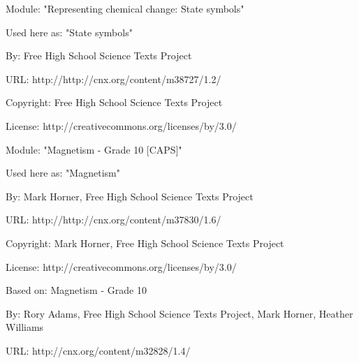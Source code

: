       \par\vspace{9pt}\noindent\begin{minipage}{\textwidth}
      Module: "Representing chemical change: State symbols" \par\nopagebreak\noindent
      Used here as: "State symbols" \par\nopagebreak\noindent
        By: Free High School Science Texts Project\par\nopagebreak\noindent
      URL: http://http://cnx.org/content/m38727/1.2/\par\nopagebreak\noindent
      \par\nopagebreak\noindent
      Copyright: Free High School Science Texts Project\par\nopagebreak\noindent
      License:  http://creativecommons.org/licenses/by/3.0/\par\nopagebreak\noindent
      \par\end{minipage}
      \par\vspace{9pt}\noindent\begin{minipage}{\textwidth}
      Module: "Magnetism - Grade 10 [CAPS]" \par\nopagebreak\noindent
      Used here as: "Magnetism" \par\nopagebreak\noindent
        By: Mark Horner, Free High School Science Texts Project\par\nopagebreak\noindent
      URL: http://http://cnx.org/content/m37830/1.6/\par\nopagebreak\noindent
      \par\nopagebreak\noindent
      Copyright: Mark Horner, Free High School Science Texts Project\par\nopagebreak\noindent
      License:  http://creativecommons.org/licenses/by/3.0/\par\nopagebreak\noindent
      Based on: Magnetism - Grade 10\par\nopagebreak\noindent
        By: Rory Adams, Free High School Science Texts Project, Mark Horner, Heather Williams\par\nopagebreak\noindent
        URL: http://cnx.org/content/m32828/1.4/
        \par\end{minipage}
